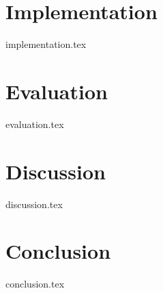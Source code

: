 \documentclass[12pt, a4paper]{report}
\begin{document}
\chapter{Implementation} \label{chapter:implementation}
{implementation.tex}

\chapter{Evaluation} \label{chapter:evaluation}
{evaluation.tex}

\chapter{Discussion} \label{chapter:discussion}
{discussion.tex}

\chapter{Conclusion} \label{chapter:conclusion}
{conclusion.tex}

\glsaddall
\printglossary
{}

\onecolumn
{}
\printbibliography[title = {References}]
\end{document}
